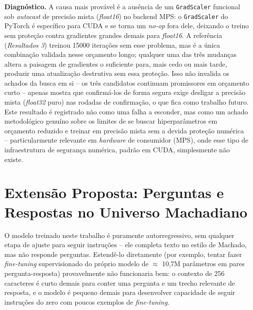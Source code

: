 \documentclass[conference]{IEEEtran}
\begin{document}
\textbf{Diagnóstico.} A causa mais provável é a ausência de um
\texttt{GradScaler} funcional sob \textit{autocast} de precisão mista
(\textit{float16}) no backend MPS: o \texttt{GradScaler} do PyTorch é
específico para CUDA e se torna um \textit{no-op} fora dele, deixando o
treino sem proteção contra gradientes grandes demais para \textit{float16}.
A referência (\textit{Resultados 3}) treinou 15000 iterações sem esse
problema, mas é a única combinação validada nesse orçamento longo; qualquer
uma das três mudanças altera a paisagem de gradientes o suficiente para, mais
cedo ou mais tarde, produzir uma atualização destrutiva sem essa proteção.
Isso não invalida os achados da busca em si -- os três candidatos continuam
promissores em orçamento curto -- apenas mostra que confirmá-los de forma
segura exige desligar a precisão mista (\textit{float32} puro) nas rodadas
de confirmação, o que fica como trabalho futuro. Este resultado é registrado
não como uma falha a esconder, mas como um achado metodológico genuíno sobre
os limites de se buscar hiperparâmetros em orçamento reduzido e treinar em
precisão mista sem a devida proteção numérica -- particularmente relevante
em \textit{hardware} de consumidor (MPS), onde esse tipo de infraestrutura de
segurança numérica, padrão em CUDA, simplesmente não existe.

\section{Extensão Proposta: Perguntas e Respostas no Universo Machadiano}
\label{sec:extensao}

O modelo treinado neste trabalho é puramente autorregressivo, sem qualquer
etapa de ajuste para seguir instruções -- ele completa texto no estilo de
Machado, mas não responde perguntas. Estendê-lo diretamente (por exemplo,
tentar fazer \textit{fine-tuning} supervisionado do próprio modelo de $\approx$
10,7M parâmetros em pares pergunta-resposta) provavelmente não funcionaria
bem: o contexto de 256 caracteres é curto demais para conter uma pergunta e
um trecho relevante de resposta, e o modelo é pequeno demais para desenvolver
capacidade de seguir instruções do zero com poucos exemplos de
\textit{fine-tuning}.
\end{document}
